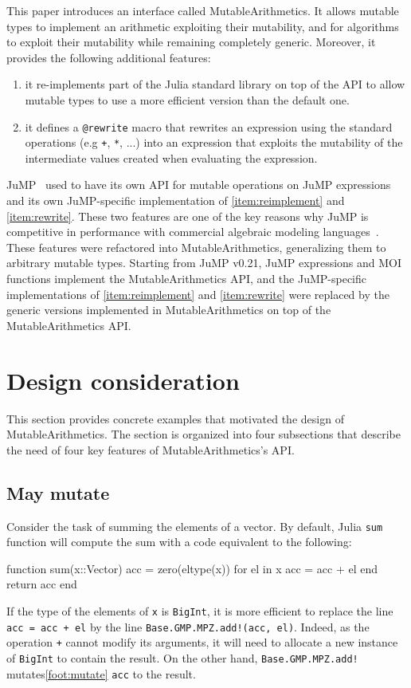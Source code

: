 \documentclass{juliacon}
\newcommand{\ma}{MutableArithmetics}
\begin{document}
This paper introduces an interface called \ma{}.
It allows mutable types to implement an arithmetic exploiting their mutability, and for algorithms to
exploit their mutability while remaining completely generic.
Moreover, it provides the following additional features:
\begin{enumerate}
  \item
    \label{item:reimplement}
    it re-implements part of the Julia standard library on top of the API to allow mutable types to use a more efficient version than the default one.
  \item
    \label{item:rewrite}
    it defines a \lstinline|@rewrite| macro that rewrites an expression using the standard operations (e.g \lstinline|+|, \lstinline|*|, ...) into an expression that exploits the mutability of the intermediate values created when evaluating the expression.
\end{enumerate}

JuMP~\cite{dunning2017jump} used to have its own API for mutable operations on JuMP expressions and
its own JuMP-specific implementation of \ref{item:reimplement} and \ref{item:rewrite}.
These two features are one of the key reasons why JuMP is competitive in performance with commercial algebraic modeling languages~\cite[Section~3--4]{dunning2017jump}.
These features were refactored into \ma{}, generalizing them to arbitrary mutable types.
Starting from JuMP v0.21, JuMP expressions and MOI functions implement the \ma{} API, and
the JuMP-specific implementations of \ref{item:reimplement} and \ref{item:rewrite} were replaced by the generic versions implemented in \ma{} on top of the \ma{} API.

\section{Design consideration}
This section provides concrete examples that motivated the design of \ma{}.
The section is organized into four subsections that describe the need of four key features of \ma{}'s API.

\subsection{May mutate}
\label{sec:may_mutate}
Consider the task of summing the elements of a vector.
By default, Julia \lstinline|sum| function will compute the sum with a code equivalent to the following:
\begin{jllisting}
function sum(x::Vector)
    acc = zero(eltype(x))
    for el in x
        acc = acc + el
    end
    return acc
end
\end{jllisting}
If the type of the elements of \lstinline|x| is \lstinline|BigInt|, it is more efficient to replace the line
\lstinline|acc = acc + el| by the line
\lstinline|Base.GMP.MPZ.add!(acc, el)|.
Indeed, as the operation \lstinline|+| cannot modify its arguments,
it will need to allocate a new instance of \lstinline|BigInt| to contain the result.
On the other hand, \lstinline|Base.GMP.MPZ.add!| mutates\cref{foot:mutate} \lstinline|acc| to the result.
\end{document}
